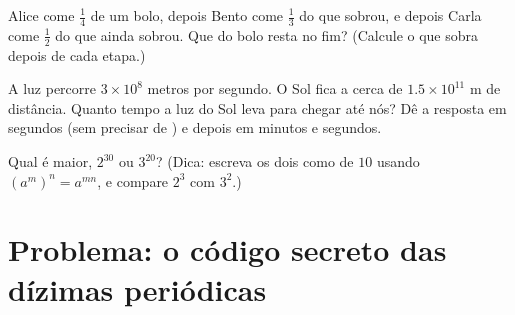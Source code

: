 \begin{exercise}[$\star\star$]\label{exo:g9:fractions:8}
Alice come $\frac14$ de um bolo, depois Bento come $\frac13$ do que
sobrou, e depois Carla come $\frac12$ do que ainda sobrou. Que 
do bolo resta no fim? (Calcule o que sobra depois de cada etapa.)
\end{exercise}

\begin{exercise}[$\star\star$]\label{exo:g9:fractions:9}
A luz percorre $3 \times 10^8$ metros por segundo. O Sol fica a cerca
de $1.5 \times 10^{11}$ m de distância. Quanto tempo a luz do Sol leva
para chegar até nós? Dê a resposta em segundos (sem precisar de ) e depois em minutos e segundos.
\end{exercise}

\begin{exercise}[$\star\star\star$]\label{exo:g9:fractions:10}
Qual é maior, $2^{30}$ ou $3^{20}$? (Dica: escreva os dois como
 de  $10$ usando
$\left(a^m\right)^n = a^{mn}$, e compare $2^3$ com $3^2$.)
\end{exercise}

\section{Problema: o código secreto das dízimas periódicas}

